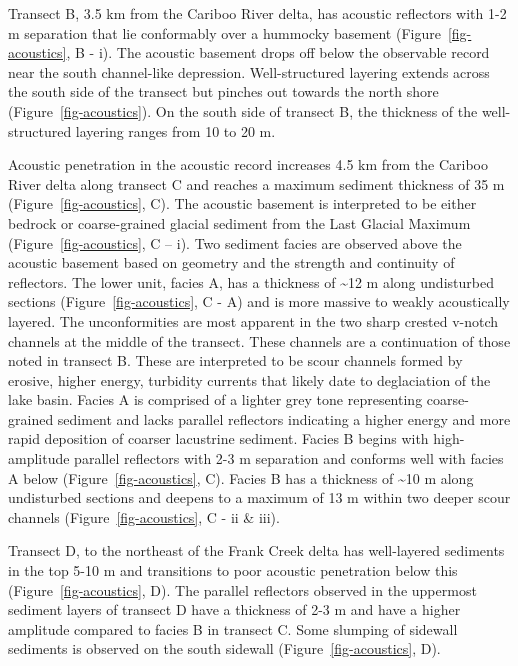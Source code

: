 \documentclass[
  letterpaper,
  DIV=11,
  numbers=noendperiod]{scrartcl}
\begin{document}
Transect B, 3.5 km from the Cariboo River delta, has acoustic reflectors
with 1-2 m separation that lie conformably over a hummocky basement
(Figure~\ref{fig-acoustics}, B - i). The acoustic basement drops off
below the observable record near the south channel-like depression.
Well-structured layering extends across the south side of the transect
but pinches out towards the north shore (Figure~\ref{fig-acoustics}). On
the south side of transect B, the thickness of the well-structured
layering ranges from 10 to 20 m.

Acoustic penetration in the acoustic record increases 4.5 km from the
Cariboo River delta along transect C and reaches a maximum sediment
thickness of 35 m (Figure~\ref{fig-acoustics}, C). The acoustic basement
is interpreted to be either bedrock or coarse-grained glacial sediment
from the Last Glacial Maximum (Figure~\ref{fig-acoustics}, C -- i). Two
sediment facies are observed above the acoustic basement based on
geometry and the strength and continuity of reflectors. The lower unit,
facies A, has a thickness of \textasciitilde12 m along undisturbed
sections (Figure~\ref{fig-acoustics}, C - A) and is more massive to
weakly acoustically layered. The unconformities are most apparent in the
two sharp crested v-notch channels at the middle of the transect. These
channels are a continuation of those noted in transect B. These are
interpreted to be scour channels formed by erosive, higher energy,
turbidity currents that likely date to deglaciation of the lake basin.
Facies A is comprised of a lighter grey tone representing coarse-grained
sediment and lacks parallel reflectors indicating a higher energy and
more rapid deposition of coarser lacustrine sediment. Facies B begins
with high-amplitude parallel reflectors with 2-3 m separation and
conforms well with facies A below (Figure~\ref{fig-acoustics}, C).
Facies B has a thickness of \textasciitilde10 m along undisturbed
sections and deepens to a maximum of 13 m within two deeper scour
channels (Figure~\ref{fig-acoustics}, C - ii \& iii).

Transect D, to the northeast of the Frank Creek delta has well-layered
sediments in the top 5-10 m and transitions to poor acoustic penetration
below this (Figure~\ref{fig-acoustics}, D). The parallel reflectors
observed in the uppermost sediment layers of transect D have a thickness
of 2-3 m and have a higher amplitude compared to facies B in transect C.
Some slumping of sidewall sediments is observed on the south sidewall
(Figure~\ref{fig-acoustics}, D).
\end{document}
